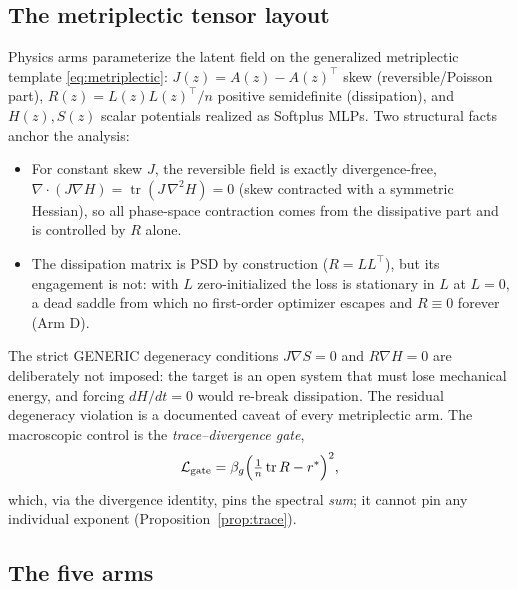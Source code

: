 \documentclass[11pt]{article}
\newcommand{\tr}{\operatorname{tr}}
\newcommand{\grad}{\nabla}
\begin{document}
\subsection{The metriplectic tensor layout}
\label{sec:methods-metriplectic}

Physics arms parameterize the latent field on the generalized
metriplectic template \eqref{eq:metriplectic}: $J(z)=A(z)-A(z)^\top$
skew (reversible/Poisson part), $R(z)=L(z)L(z)^\top/n$ positive
semidefinite (dissipation), and $H(z),S(z)$ scalar potentials realized as
Softplus MLPs. Two structural facts anchor the analysis:
\begin{itemize}
\item For constant skew $J$, the reversible field is exactly
divergence-free, $\grad\!\cdot(J\grad H)=\tr(J\,\grad^2H)=0$ (skew
contracted with a symmetric Hessian), so all phase-space contraction
comes from the dissipative part and is controlled by $R$ alone.
\item The dissipation matrix is PSD by construction ($R=LL^\top$), but
its engagement is not: with $L$ zero-initialized the loss is stationary
in $L$ at $L=0$, a dead saddle from which no first-order optimizer
escapes and $R\equiv0$ forever (Arm D).
\end{itemize}
The strict GENERIC degeneracy conditions $J\grad S=0$ and $R\grad H=0$
\cite{grmela1997dynamics,ottinger1997dynamics} are deliberately not
imposed: the target is an open system that must lose mechanical energy,
and forcing $dH/dt=0$ would re-break dissipation. The residual
degeneracy violation is a documented caveat of every metriplectic arm.
The macroscopic control is the \emph{trace--divergence gate},
\begin{equation}
  \mathcal L_{\rm gate}=\beta_g\Big(\tfrac1n\tr R - r^\ast\Big)^2,
\end{equation}
which, via the divergence identity, pins the spectral \emph{sum}; it
cannot pin any individual exponent (Proposition~\ref{prop:trace}).

\subsection{The five arms}
\label{sec:methods-arms}
\end{document}
